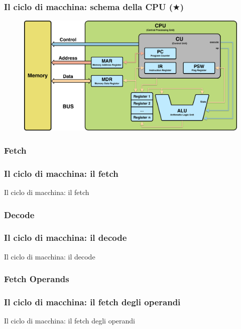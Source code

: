 \begin{frame}
	\frametitle{Il ciclo di macchina: schema della CPU ($\bigstar$)}
	
	\begin{figure}[!htbp] 
		\centering
		\includegraphics[width=1.0\linewidth]{images/4_cpu/architecture_cpu_complex.pdf}
		\label{fig:cpu_complex}
	\end{figure}
	 
\end{frame}



\subsubsection[Fetch]{Fetch}
\begin{frame}
	\frametitle{Il ciclo di macchina: il fetch}
	
	\begin{block}{Il ciclo di macchina: il fetch}	
	\end{block}
	
\end{frame}


\subsubsection[Decode]{Decode}
\begin{frame}
	\frametitle{Il ciclo di macchina: il decode}
	
	\begin{block}{Il ciclo di macchina: il decode}	
	\end{block}
	
\end{frame}

\subsubsection[Fetch Operands]{Fetch Operands}
\begin{frame}
	\frametitle{Il ciclo di macchina: il fetch degli operandi}
	
	\begin{block}{Il ciclo di macchina: il fetch degli operandi}	
	\end{block}
	
\end{frame}



